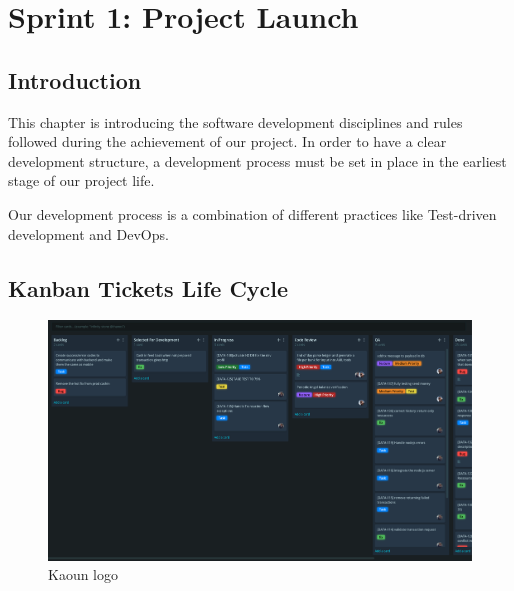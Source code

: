 
\setcounter{chapter}{2}
\chapter{Sprint 1: Project Launch}
\minitoc %
\graphicspath{{Chapter3/figures/}}

\pagestyle{fancy}
\fancyhf{}
\fancyhead[R]{\bfseries\rightmark}
\fancyfoot[R]{\thepage}
\renewcommand{\headrulewidth}{0.5pt}
\renewcommand{\footrulewidth}{0pt}
\renewcommand{\chaptermark}[1]{\markboth{\MakeUppercase{\chaptername~\thechapter. #1 }}{}}
\renewcommand{\sectionmark}[1]{\markright{\thechapter.\thesection~ #1}}

\begin{spacing}{1.2}


\section*{Introduction}
This chapter is introducing the software development disciplines and rules followed during the achievement of our project. In order to have a clear development structure, a development process must be set in place in the earliest stage of our project life.

Our development process is a combination of different practices like Test-driven development and DevOps.

\section{Kanban Tickets Life Cycle}

\begin{figure}[!ht]\centering
\includegraphics[scale=0.3]{kanban_board.png}
\caption{Kaoun logo}
\label{fig:fig1}
\end{figure}


\end{spacing}
